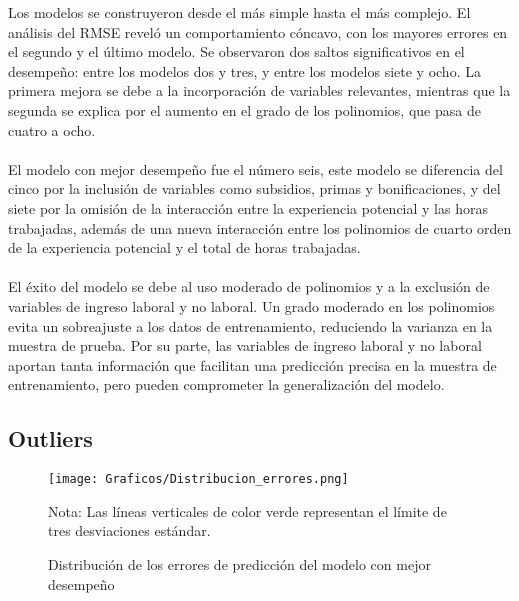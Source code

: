 \documentclass[article,11 pt]{article}
\begin{document}
Los modelos se construyeron desde el más simple hasta el más complejo. El análisis del RMSE reveló un comportamiento cóncavo, con los mayores errores en el segundo y el último modelo. Se observaron dos saltos significativos en el desempeño: entre los modelos dos y tres, y entre los modelos siete y ocho. La primera mejora se debe a la incorporación de variables relevantes, mientras que la segunda se explica por el aumento en el grado de los polinomios, que pasa de cuatro a ocho.
\\
\\
El modelo con mejor desempeño fue el número seis, este modelo se diferencia del cinco por la inclusión de variables como subsidios, primas y bonificaciones, y del siete por la omisión de la interacción entre la experiencia potencial y las horas trabajadas, además de una nueva interacción entre los polinomios de cuarto orden de la experiencia potencial y el total de horas trabajadas.
\\
\\
El éxito del modelo se debe al uso moderado de polinomios y a la exclusión de variables de ingreso laboral y no laboral. Un grado moderado en los polinomios evita un sobreajuste a los datos de entrenamiento, reduciendo la varianza en la muestra de prueba. Por su parte, las variables de ingreso laboral y no laboral aportan tanta información que facilitan una predicción precisa en la muestra de entrenamiento, pero pueden comprometer la generalización del modelo.

\subsection{Outliers}

\begin{figure}[h]
    \centering
    \caption{Distribución de los errores de predicción del modelo con mejor desempeño}
    \texttt{[image: Graficos/Distribucion\_errores.png]}    
    \label{fig:Errores}
    
    \vspace{0.1cm} %
    \footnotesize Nota: Las líneas verticales de color verde representan el límite de tres desviaciones estándar.
\end{figure}
\end{document}
